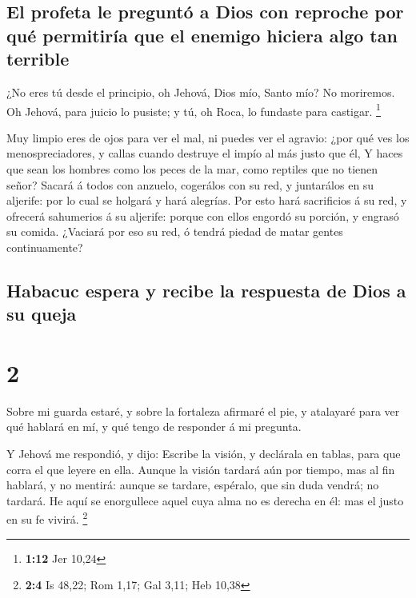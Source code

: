 \hypertarget{el-profeta-le-preguntuxf3-a-dios-con-reproche-por-quuxe9-permitiruxeda-que-el-enemigo-hiciera-algo-tan-terrible}{%
\subsection{El profeta le preguntó a Dios con reproche por qué
permitiría que el enemigo hiciera algo tan
terrible}\label{el-profeta-le-preguntuxf3-a-dios-con-reproche-por-quuxe9-permitiruxeda-que-el-enemigo-hiciera-algo-tan-terrible}}

 ¿No eres tú desde el principio, oh Jehová, Dios mío, Santo
mío? No moriremos. Oh Jehová, para juicio lo pusiste; y tú, oh Roca, lo
fundaste para castigar. \footnote{\textbf{1:12} Jer 10,24}

 Muy limpio eres de ojos para ver el mal, ni puedes ver el
agravio: ¿por qué ves los menospreciadores, y callas cuando destruye el
impío al más justo que él,  Y haces que sean los hombres
como los peces de la mar, como reptiles que no tienen señor?
 Sacará á todos con anzuelo, cogerálos con su red, y
juntarálos en su aljerife: por lo cual se holgará y hará alegrías.
 Por esto hará sacrificios á su red, y ofrecerá sahumerios
á su aljerife: porque con ellos engordó su porción, y engrasó su comida.
 ¿Vaciará por eso su red, ó tendrá piedad de matar gentes
continuamente?

\hypertarget{habacuc-espera-y-recibe-la-respuesta-de-dios-a-su-queja}{%
\subsection{Habacuc espera y recibe la respuesta de Dios a su
queja}\label{habacuc-espera-y-recibe-la-respuesta-de-dios-a-su-queja}}

\hypertarget{section-1}{%
\section{2}\label{section-1}}

 Sobre mi guarda estaré, y sobre la fortaleza afirmaré el
pie, y atalayaré para ver qué hablará en mí, y qué tengo de responder á
mi pregunta.

 Y Jehová me respondió, y dijo: Escribe la visión, y
declárala en tablas, para que corra el que leyere en ella. 
Aunque la visión tardará aún por tiempo, mas al fin hablará, y no
mentirá: aunque se tardare, espéralo, que sin duda vendrá; no tardará.
 He aquí se enorgullece aquel cuya alma no es derecha en él:
mas el justo en su fe vivirá. \footnote{\textbf{2:4} Is 48,22; Rom 1,17;
  Gal 3,11; Heb 10,38}

